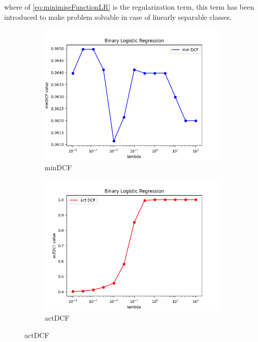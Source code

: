 where \lampda of \autoref{eq:minimiseFunctionLR} is the regularization term, this term has been introduced to make problem
solvable in case of linearly separable classes.

\begin{figure}[h!]
    \centering
    \begin{subfigure}[b]{0.3\linewidth}
        \includegraphics[width=\linewidth]{Lab/08. Lab 08/Images/01. BLR - minDCF}
        \caption{minDCF}
        \label{fig:BLRminDCF}
    \end{subfigure}
    \begin{subfigure}[b]{0.3\linewidth}
        \includegraphics[width=\linewidth]{Lab/08. Lab 08/Images/02. BLR - actDCF}
        \caption{actDCF}

\end{subfigure}
\end{figure}
